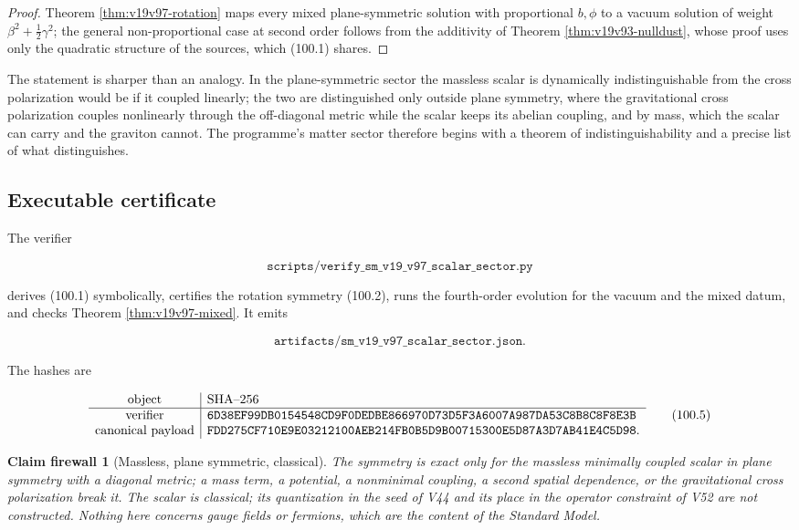 \documentclass[11pt]{article}
\newtheorem{firewall}[theorem]{Claim firewall}
\theoremstyle{remark}
\begin{document}
\begin{proof}
Theorem \ref{thm:v19v97-rotation} maps every mixed plane-symmetric
solution with proportional \(b,\phi\) to a vacuum solution of weight
\(\beta^2+\tfrac12\gamma^2\); the general non-proportional case at
second order follows from the additivity of Theorem
\ref{thm:v19v93-nulldust}, whose proof uses only the quadratic
structure of the sources, which (100.1) shares.
\end{proof}

The statement is sharper than an analogy.  In the plane-symmetric
sector the massless scalar is dynamically indistinguishable from the
cross polarization would be if it coupled linearly; the two are
distinguished only outside plane symmetry, where the gravitational
cross polarization couples nonlinearly through the off-diagonal
metric while the scalar keeps its abelian coupling, and by mass,
which the scalar can carry and the graviton cannot.  The programme's
matter sector therefore begins with a theorem of indistinguishability
and a precise list of what distinguishes.

\subsection{Executable certificate}

The verifier

\[
 \texttt{scripts/verify\_sm\_v19\_v97\_scalar\_sector.py}             \tag{100.3}
\]

derives (100.1) symbolically, certifies the rotation symmetry
(100.2), runs the fourth-order evolution for the vacuum and the mixed
datum, and checks Theorem \ref{thm:v19v97-mixed}.  It emits

\[
 \texttt{artifacts/sm\_v19\_v97\_scalar\_sector.json}.                \tag{100.4}
\]

The hashes are

\[
\begin{array}{c|l}
\hbox{object}&\hbox{SHA--256}\\ \hline
\hbox{verifier}&
\texttt{6D38EF99DB0154548CD9F0DEDBE866970D73D5F3A6007A987DA53C8B8C8F8E3B}\\
\hbox{canonical payload}&
\texttt{FDD275CF710E9E03212100AEB214FB0B5D9B00715300E5D87A3D7AB41E4C5D98}.
\end{array}                                                     \tag{100.5}
\]

\begin{firewall}[Massless, plane symmetric, classical]
\label{fire:v19v97}
The symmetry is exact only for the massless minimally coupled scalar
in plane symmetry with a diagonal metric; a mass term, a potential, a
nonminimal coupling, a second spatial dependence, or the gravitational
cross polarization break it.  The scalar is classical; its
quantization in the seed of V44 and its place in the operator
constraint of V52 are not constructed.  Nothing here concerns gauge
fields or fermions, which are the content of the Standard Model.
\end{firewall}
\end{document}
